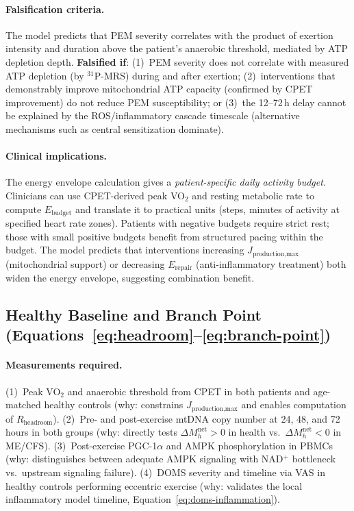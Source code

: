 \paragraph{Falsification criteria.}
The model predicts that PEM severity correlates with the product of exertion intensity and duration above the patient's anaerobic threshold, mediated by ATP depletion depth. \textbf{Falsified if}: (1)~PEM severity does not correlate with measured ATP depletion (by $^{31}$P-MRS) during and after exertion; (2)~interventions that demonstrably improve mitochondrial ATP capacity (confirmed by CPET improvement) do not reduce PEM susceptibility; or (3)~the 12--72\,h delay cannot be explained by the ROS/inflammatory cascade timescale (alternative mechanisms such as central sensitization dominate).

\paragraph{Clinical implications.}
The energy envelope calculation gives a \emph{patient-specific daily activity budget}. Clinicians can use CPET-derived peak VO$_2$ and resting metabolic rate to compute $E_{\text{budget}}$ and translate it to practical units (steps, minutes of activity at specified heart rate zones). Patients with negative budgets require strict rest; those with small positive budgets benefit from structured pacing within the budget. The model predicts that interventions increasing $J_{\text{production,max}}$ (mitochondrial support) or decreasing $E_{\text{repair}}$ (anti-inflammatory treatment) both widen the energy envelope, suggesting combination benefit.

\subsection{Healthy Baseline and Branch Point (Equations~\ref{eq:headroom}--\ref{eq:branch-point})}

\paragraph{Measurements required.}
(1)~Peak VO$_2$ and anaerobic threshold from CPET in both patients and age-matched healthy controls (why: constrains $J_{\text{production,max}}$ and enables computation of $R_{\text{headroom}}$).
(2)~Pre- and post-exercise mtDNA copy number at 24, 48, and 72 hours in both groups (why: directly tests $\Delta M_h^{\text{net}} > 0$ in health vs.\ $\Delta M_h^{\text{net}} < 0$ in ME/CFS).
(3)~Post-exercise PGC-1$\alpha$ and AMPK phosphorylation in PBMCs (why: distinguishes between adequate AMPK signaling with NAD$^+$ bottleneck vs.\ upstream signaling failure).
(4)~DOMS severity and timeline via VAS in healthy controls performing eccentric exercise (why: validates the local inflammatory model timeline, Equation~\ref{eq:doms-inflammation}).

